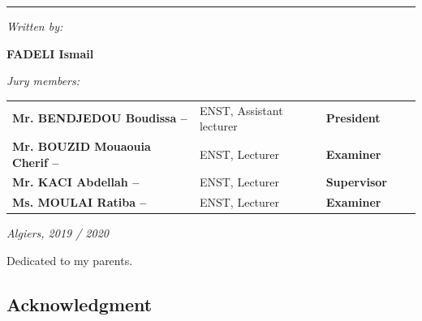 \documentclass[12pt]{report}
\newenvironment{dedication}
  {\clearpage           %
   \thispagestyle{empty}%
   \vspace*{\stretch{1}}%
   \itshape             %
   \raggedleft          %
  }
  {\par %
   \vspace{\stretch{3}} %
   \clearpage           %
  }
\def\blankpage{%
      \clearpage%
      \thispagestyle{empty}%
      \addtocounter{page}{-1}%
      \null%
      \clearpage}
\begin{document}
\begin{titlepage}
\begin{center}
\begin{center}
		\rule{\linewidth}{.5pt}
		
	\end{center}
	
	\emph{Written by:}
	
	\vskip 4mm
	
	{\bf FADELI Ismail}
\end{center}
	\vskip 4mm
	\emph{Jury members:}
	 \vskip 4mm
	


\begin{flushleft}
	
	\begin{tabular}{lp{4cm}lp{4cm}l}
		{\small {\bf 
Mr. BENDJEDOU Boudissa \hspace{0.5cm}--}}      & {\small ENST, Assistant lecturer}  \hspace{5cm}                  & {\small {\bf President}} \\[3mm]
        {\small {\bf Mr. BOUZID Mouaouia Cherif \hspace{0.5cm}--}}      & {\small ENST, Lecturer}  \hspace{5cm}                  & {\small {\bf Examiner }}  \\[3mm]
		{\small {\bf Mr. KACI Abdellah \hspace{0.5cm}--}}      & {\small ENST, Lecturer}  \hspace{5cm}                  & {\small {\bf Supervisor}}   \\[3mm]
		{\small {\bf Ms. MOULAI Ratiba \hspace{0.5cm}--}}      & {\small ENST, Lecturer}  \hspace{5cm}                  & {\small {\bf Examiner}}   
	\end{tabular}
\end{flushleft}


\vskip 1.5mm
\begin{center}
	\emph{Algiers, 2019 / 2020 }\\
	
\end{center}
   

\end{titlepage}

\blankpage
\thispagestyle{empty}
\begin{dedication}
Dedicated to my parents.

\end{dedication}



\clearpage
\begin{center}


\section*{Acknowledgment}
\end{center}
\end{document}
